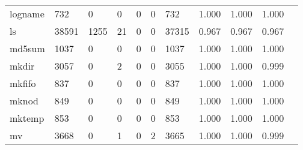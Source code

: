 \begin{longtable}{lp{1.10cm}p{1.10cm}p{1.10cm}p{1.10cm}p{1.10cm}p{1.10cm}p{1.10cm}p{1.10cm}p{1.10cm}p{1.10cm}}
logname   &                    732 &                                  0 &                                 0 &                                0 &                                 0 &                             732 &                          1.000 &                                 1.000 &                               1.000 \\
ls        &                  38591 &                               1255 &                                21 &                                0 &                                 0 &                           37315 &                          0.967 &                                 0.967 &                               0.967 \\
md5sum    &                   1037 &                                  0 &                                 0 &                                0 &                                 0 &                            1037 &                          1.000 &                                 1.000 &                               1.000 \\
mkdir     &                   3057 &                                  0 &                                 2 &                                0 &                                 0 &                            3055 &                          1.000 &                                 1.000 &                               0.999 \\
mkfifo    &                    837 &                                  0 &                                 0 &                                0 &                                 0 &                             837 &                          1.000 &                                 1.000 &                               1.000 \\
mknod     &                    849 &                                  0 &                                 0 &                                0 &                                 0 &                             849 &                          1.000 &                                 1.000 &                               1.000 \\
mktemp    &                    853 &                                  0 &                                 0 &                                0 &                                 0 &                             853 &                          1.000 &                                 1.000 &                               1.000 \\
mv        &                   3668 &                                  0 &                                 1 &                                0 &                                 2 &                            3665 &                          1.000 &                                 1.000 &                               0.999 \\

\end{longtable}
